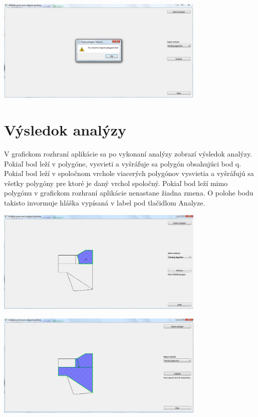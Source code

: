 \documentclass[12pt]{article}
\begin{document}
\begin{center}
   \includegraphics[width=10cm]{./img/warning.png}
\end{center}

\section{Výsledok analýzy}
V grafickom rozhraní aplikácie sa po vykonaní analýzy zobrazí výsledok analýzy. Pokiaľ bod leží v polygóne, vysvieti a vyšráfuje sa polygón obsahujúci bod q. Pokiaľ bod leží v spoločnom vrchole viacerých polygónov vysvietia a vyšráfujú sa všetky polygóny pre ktoré je daný vrchol spoločný. Pokiaľ bod leží mimo polygónu v grafickom rozhraní aplikácie nenastane žiadna zmena. O polohe bodu takisto invormuje hláška vypísaná v label pod tlačidlom Analyze.

\begin{center}
   \includegraphics[width=10cm]{./img/bod_v_polygone.png}
\end{center}

\begin{center}
   \includegraphics[width=10cm]{./img/bod_na_vrchole.png}
\end{center}
\end{document}
